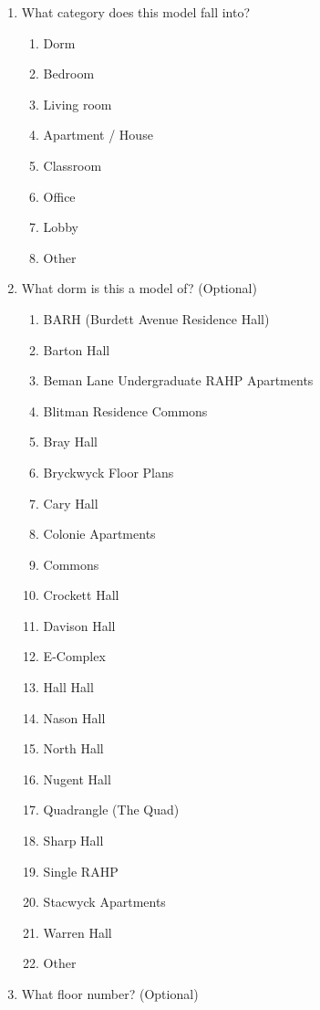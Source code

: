 \documentclass[12pt]{article}
\begin{document}
      \begin{enumerate}
        \item What category does this model fall into?
        \begin{enumerate}
          \item Dorm
          \item Bedroom
          \item Living room 
          \item Apartment / House
          \item Classroom
          \item Office
          \item Lobby
          \item Other
        \end{enumerate}
      \item What dorm is this a model of? (Optional)
      \begin{enumerate}
        \item BARH (Burdett Avenue Residence Hall)
        \item Barton Hall
        \item Beman Lane Undergraduate RAHP Apartments
        \item Blitman Residence Commons
        \item Bray Hall
        \item Bryckwyck Floor Plans
        \item Cary Hall
        \item Colonie Apartments
        \item Commons
        \item Crockett Hall
        \item Davison Hall
        \item E-Complex
        \item Hall Hall
        \item Nason Hall
        \item North Hall
        \item Nugent Hall
        \item Quadrangle (The Quad)
        \item Sharp Hall
        \item Single RAHP
        \item Stacwyck Apartments
        \item Warren Hall
        \item Other
      \end{enumerate}
    \item What floor number? (Optional)

\end{enumerate}
\end{document}
